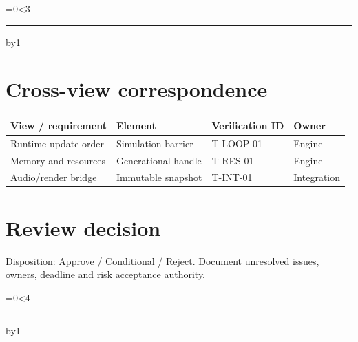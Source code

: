 \documentclass[11pt,letterpaper]{article}
\newcommand{\WriteLines}[1]{\par\begingroup\setlength{\parskip}{9pt}\count255=0\loop\ifnum\count255<#1\noindent\rule{\linewidth}{0.35pt}\par\advance\count255 by1\repeat\endgroup\smallskip}
\begin{document}
\WriteLines{3}
\section{Cross-view correspondence}
\small\begin{longtable}{|p{\dimexpr(\linewidth-8\tabcolsep-5\arrayrulewidth-1pt)/4\relax}|p{\dimexpr(\linewidth-8\tabcolsep-5\arrayrulewidth-1pt)/4\relax}|p{\dimexpr(\linewidth-8\tabcolsep-5\arrayrulewidth-1pt)/4\relax}|p{\dimexpr(\linewidth-8\tabcolsep-5\arrayrulewidth-1pt)/4\relax}|}
\hline \textbf{View / requirement} & \textbf{Element} & \textbf{Verification ID} & \textbf{Owner}\\ \hline\endhead
Runtime update order & Simulation barrier & T-LOOP-01 & Engine\\ \hline
Memory and resources & Generational handle & T-RES-01 & Engine\\ \hline
Audio/render bridge & Immutable snapshot & T-INT-01 & Integration\\ \hline
\end{longtable}\normalsize
\section{Review decision}
Disposition: Approve / Conditional / Reject. Document unresolved issues, owners, deadline and risk acceptance authority.

\WriteLines{4}
\end{document}
